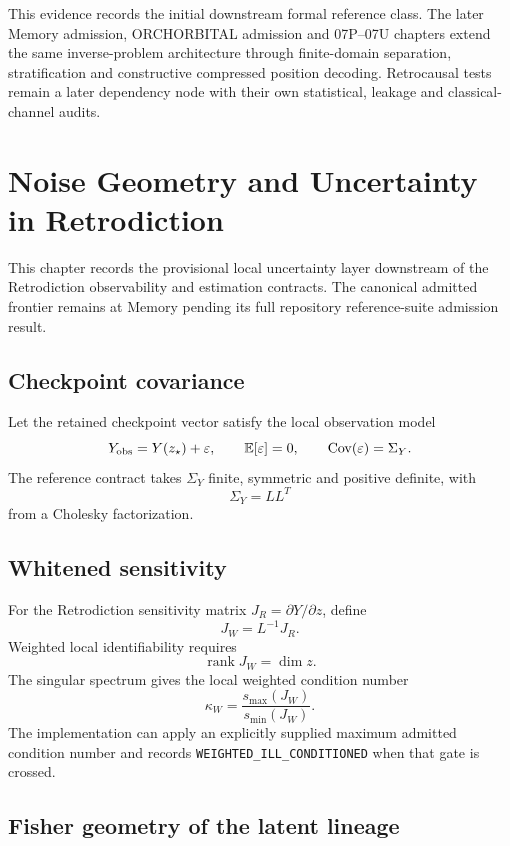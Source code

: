 This evidence records the initial downstream formal reference class. The later Memory admission, ORCHORBITAL admission and 07P--07U chapters extend the same inverse-problem architecture through finite-domain separation, stratification and constructive compressed position decoding. Retrocausal tests remain a later dependency node with their own statistical, leakage and classical-channel audits.


\chapter{Noise Geometry and Uncertainty in Retrodiction}

This chapter records the provisional local uncertainty layer downstream of the Retrodiction observability and estimation contracts. The canonical admitted frontier remains at Memory pending its full repository reference-suite admission result.

\section{Checkpoint covariance}

Let the retained checkpoint vector satisfy the local observation model
\[
Y_{\rm obs}=Y(z_\star)+\varepsilon,
\qquad
\mathbb E[\varepsilon]=0,
\qquad
\operatorname{Cov}(\varepsilon)=\Sigma_Y.
\]
The reference contract takes \(\Sigma_Y\) finite, symmetric and positive definite, with
\[
\boxed{\Sigma_Y=LL^T}
\]
from a Cholesky factorization.

\section{Whitened sensitivity}

For the Retrodiction sensitivity matrix \(J_R=\partial Y/\partial z\), define
\[
\boxed{J_W=L^{-1}J_R.}
\]
Weighted local identifiability requires
\[
\boxed{\operatorname{rank}J_W=\dim z.}
\]
The singular spectrum gives the local weighted condition number
\[
\boxed{
\kappa_W=\frac{s_{\max}(J_W)}{s_{\min}(J_W)}.
}
\]
The implementation can apply an explicitly supplied maximum admitted condition number and records \texttt{WEIGHTED\_ILL\_CONDITIONED} when that gate is crossed.

\section{Fisher geometry of the latent lineage}

